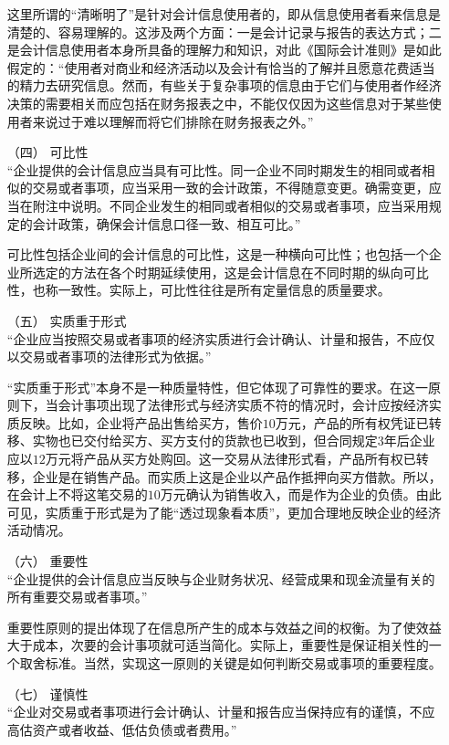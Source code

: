 \begin{enumerate}
						这里所谓的“清晰明了”是针对会计信息使用者的，即从信息使用者看来信息是清楚的、容易理解的。这涉及两个方面：一是会计记录与报告的表达方式；二是会计信息使用者本身所具备的理解力和知识，对此《国际会计准则》是如此假定的：“使用者对商业和经济活动以及会计有恰当的了解并且愿意花费适当的精力去研究信息。然而，有些关于复杂事项的信息由于它们与使用者作经济决策的需要相关而应包括在财务报表之中，不能仅仅因为这些信息对于某些使用者来说过于难以理解而将它们排除在财务报表之外。”
					\item[（四）] 可比性 \\
						“企业提供的会计信息应当具有可比性。同一企业不同时期发生的相同或者相似的交易或者事项，应当采用一致的会计政策，不得随意变更。确需变更，应当在附注中说明。不同企业发生的相同或者相似的交易或者事项，应当采用规定的会计政策，确保会计信息口径一致、相互可比。”

						可比性包括企业间的会计信息的可比性，这是一种横向可比性；也包括一个企业所选定的方法在各个时期延续使用，这是会计信息在不同时期的纵向可比性，也称一致性。实际上，可比性往往是所有定量信息的质量要求。
					\item[（五）] 实质重于形式 \\
						“企业应当按照交易或者事项的经济实质进行会计确认、计量和报告，不应仅以交易或者事项的法律形式为依据。”
						
						“实质重于形式”本身不是一种质量特性，但它体现了可靠性的要求。在这一原则下，当会计事项出现了法律形式与经济实质不符的情况时，会计应按经济实质反映。比如，企业将产品出售给买方，售价$10$万元，产品的所有权凭证已转移、实物也已交付给买方、买方支付的货款也已收到，但合同规定$3$年后企业应以$12$万元将产品从买方处购回。这一交易从法律形式看，产品所有权已转移，企业是在销售产品。而实质上这是企业以产品作抵押向买方借款。所以，在会计上不将这笔交易的$10$万元确认为销售收入，而是作为企业的负债。由此可见，实质重于形式是为了能“透过现象看本质”，更加合理地反映企业的经济活动情况。
					\item[（六）] 重要性 \\
						“企业提供的会计信息应当反映与企业财务状况、经营成果和现金流量有关的所有重要交易或者事项。”
						
						重要性原则的提出体现了在信息所产生的成本与效益之间的权衡。为了使效益大于成本，次要的会计事项就可适当简化。实际上，重要性是保证相关性的一个取舍标准。当然，实现这一原则的关键是如何判断交易或事项的重要程度。
					\item[（七）] 谨慎性 \\
						“企业对交易或者事项进行会计确认、计量和报告应当保持应有的谨慎，不应高估资产或者收益、低估负债或者费用。”
						

\end{enumerate}
